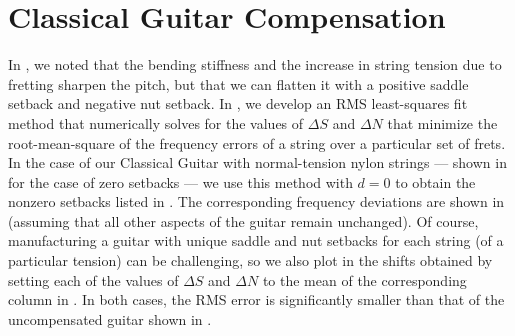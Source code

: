 %
%
%

 \section{Classical Guitar Compensation\label{sct:comp}}

 In , we noted that the bending stiffness and the increase in string tension due to fretting sharpen the pitch, but that we can flatten it with a positive saddle setback and negative nut setback. In , we develop an RMS least-squares fit method that numerically solves  for the values of $\Delta S$ and $\Delta N$ that minimize the root-mean-square of the frequency errors of a string over a particular set of frets. In the case of our Classical Guitar with normal-tension nylon strings --- shown in  for the case of zero setbacks --- we use this method with $d = 0$ to obtain the nonzero setbacks listed in . The corresponding frequency deviations are shown in  (assuming that all other aspects of the guitar remain unchanged). Of course, manufacturing a guitar with unique saddle and nut setbacks for each string (of a particular tension) can be challenging, so we also plot in  the shifts obtained by setting each of the values of $\Delta S$ and $\Delta N$ to the mean of the corresponding column in  . In both cases, the RMS error is significantly smaller than that of the uncompensated guitar shown in .

